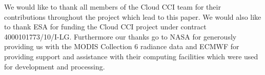 \begin{acknowledgements}
We would like to thank all members of the Cloud CCI team for their contributions throughout the project which lead to this paper. We would also like to thank ESA for funding the Cloud CCI project under contract 4000101773/10/I-LG. Furthermore our thanks go to NASA for generously providing us with the MODIS Collection 6 radiance data and ECMWF for providing support and assistance with their computing facilities which were used for development and processing.
\end{acknowledgements}
